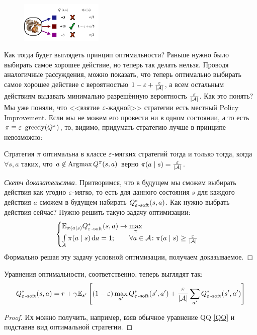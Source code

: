 \begin{figure}
\vspace{-0.4cm}
\centering
\includegraphics[width=0.35\textwidth]{Images/eSoftBellman.png}
\vspace{-0.8cm}
\end{figure}

Как тогда будет выглядеть принцип оптимальности? Раньше нужно было выбирать самое хорошее действие, но теперь так делать нельзя. Проводя аналогичные рассуждения, можно показать, что теперь оптимально выбирать самое хорошее действие с вероятностью $1 \HM- \eps \HM+ \frac{\eps}{|\A|}$, а всем остальным действиям выдавать минимально разрешённую вероятность $\frac{\varepsilon}{|\mathcal{A}|}$. Как это понять? Мы уже поняли, что <<взятие $\varepsilon$-жадной>> стратегии есть местный Policy Improvement. Если мы не можем его провести ни в одном состоянии, а то есть $\pi \equiv \varepsilon\operatorname{-greedy}(Q^{\pi})$, то, видимо, придумать стратегию лучше в принципе невозможно:

\begin{proposition}
Стратегия $\pi$ оптимальна в классе $\varepsilon$-мягких стратегий тогда и только тогда, когда $\forall s, a$ таких, что $a \not\in \mathop{\mathrm{Argmax}} Q^{\pi}(s, a)$ верно $\pi(a \mid s) \HM= \frac{\eps}{|\A|}$.
\begin{proof}[Скетч доказательства]
Притворимся, что в будущем мы сможем выбирать действия как угодно $\varepsilon$-мягко, то есть для данного состояния $s$ для каждого действия $a$ сможем в будущем набирать $Q^*_{\varepsilon\operatorname{-soft}}(s, a)$. Как нужно выбрать действия сейчас? Нужно решить такую задачу оптимизации:
$$
\begin{cases}
\mathbb{E}_{\pi(a \mid s)} Q^*_{\varepsilon\operatorname{-soft}}(s, a) \to \max\limits_{\pi} \\
\int\limits_{\mathcal{A}} \pi(a \mid s) \mathop{}\!\mathrm{d} a = 1; \qquad \forall a \in \mathcal{A} \colon \pi(a \mid s) \ge \frac{\varepsilon}{|\mathcal{A}|}
\end{cases}
$$
Формально решая эту задачу условной оптимизации, получаем доказываемое.
\end{proof}
\end{proposition}

\begin{proposition}
Уравнения оптимальности, соответственно, теперь выглядят так:
$$Q^*_{\varepsilon\operatorname{-soft}}(s, a) = r + \gamma \mathbb{E}_{s'} \left[ (1 - \varepsilon) \max_{a'} Q^*_{\varepsilon\operatorname{-soft}}(s', a') + \frac{\varepsilon}{|\mathcal{A}|} \sum_{a'} Q^*_{\varepsilon\operatorname{-soft}}(s', a') \right]$$
\begin{proof}
Их можно получить, например, взяв обычное уравнение QQ \eqref{QQ} и подставив вид оптимальной стратегии.
\end{proof}
\end{proposition}

